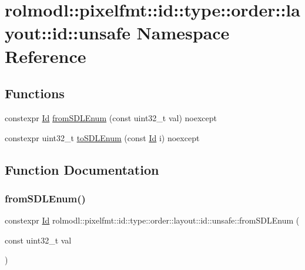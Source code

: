 \hypertarget{namespacerolmodl_1_1pixelfmt_1_1id_1_1type_1_1order_1_1layout_1_1id_1_1unsafe}{}\section{rolmodl\+::pixelfmt\+::id\+::type\+::order\+::layout\+::id\+::unsafe Namespace Reference}
\label{namespacerolmodl_1_1pixelfmt_1_1id_1_1type_1_1order_1_1layout_1_1id_1_1unsafe}
\subsection*{Functions}
\begin{DoxyCompactItemize}
\item 
constexpr \mbox{\hyperlink{namespacerolmodl_1_1pixelfmt_a96282713e4465ba9211c8fd3a702b52b}{Id}} \mbox{\hyperlink{namespacerolmodl_1_1pixelfmt_1_1id_1_1type_1_1order_1_1layout_1_1id_1_1unsafe_a74ef0f5ae6746536170bea6659828fd5}{from\+S\+D\+L\+Enum}} (const uint32\+\_\+t val) noexcept
\item 
constexpr uint32\+\_\+t \mbox{\hyperlink{namespacerolmodl_1_1pixelfmt_1_1id_1_1type_1_1order_1_1layout_1_1id_1_1unsafe_a4aa69ca9aba67ea7cda4f41f2c1ff73d}{to\+S\+D\+L\+Enum}} (const \mbox{\hyperlink{namespacerolmodl_1_1pixelfmt_a96282713e4465ba9211c8fd3a702b52b}{Id}} i) noexcept
\end{DoxyCompactItemize}


\subsection{Function Documentation}
\mbox{\label{namespacerolmodl_1_1pixelfmt_1_1id_1_1type_1_1order_1_1layout_1_1id_1_1unsafe_a74ef0f5ae6746536170bea6659828fd5}} 
\subsubsection{\texorpdfstring{fromSDLEnum()}{fromSDLEnum()}}
{\footnotesize\ttfamily constexpr \mbox{\hyperlink{namespacerolmodl_1_1pixelfmt_a96282713e4465ba9211c8fd3a702b52b}{Id}} rolmodl\+::pixelfmt\+::id\+::type\+::order\+::layout\+::id\+::unsafe\+::from\+S\+D\+L\+Enum (\begin{DoxyParamCaption}\item[{const uint32\+\_\+t}]{val }\end{DoxyParamCaption})\hspace{0.3cm}{\ttfamily [noexcept]}}



